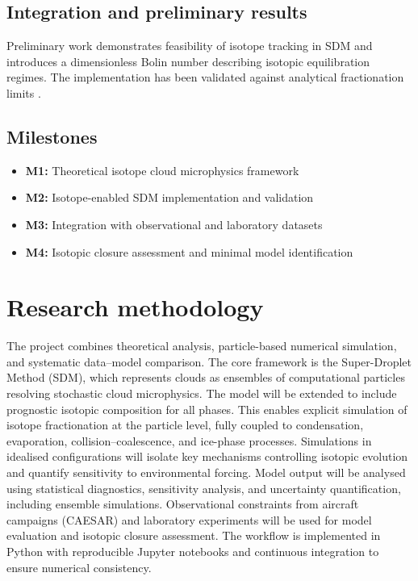 \documentclass[12pt]{article}
\begin{document}
\subsection*{Integration and preliminary results}

Preliminary work demonstrates feasibility of isotope tracking in SDM and introduces
a dimensionless Bolin number describing isotopic equilibration regimes. The
implementation has been validated against analytical fractionation limits
\parencite{1994_Gedzelman_Arnold}.

\subsection*{Milestones}

\begin{itemize}
\item \textbf{M1:} Theoretical isotope cloud microphysics framework
\item \textbf{M2:} Isotope-enabled SDM implementation and validation
\item \textbf{M3:} Integration with observational and laboratory datasets
\item \textbf{M4:} Isotopic closure assessment and minimal model identification
\end{itemize}

\section{Research methodology}

The project combines theoretical analysis, particle-based numerical simulation,
and systematic data--model comparison.
The core framework is the Super-Droplet Method (SDM), which represents clouds
as ensembles of computational particles resolving stochastic cloud microphysics.
The model will be extended to include prognostic isotopic
composition for all phases.
This enables explicit simulation of isotope fractionation at the particle level,
fully coupled to condensation, evaporation, collision--coalescence, and ice-phase
processes.
Simulations in idealised configurations will isolate key mechanisms controlling
isotopic evolution and quantify sensitivity to environmental forcing.
Model output will be analysed using statistical diagnostics, sensitivity analysis,
and uncertainty quantification, including ensemble simulations.
Observational constraints from aircraft campaigns (CAESAR) and laboratory experiments
will be used for model evaluation and isotopic closure assessment.
The workflow is implemented in Python with reproducible Jupyter notebooks and
continuous integration to ensure numerical consistency.
\end{document}
